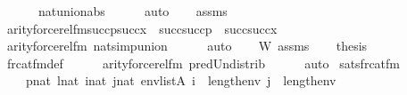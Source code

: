 \begin{isabellebody}
\ \ \ \ \ \ nat{\isacharunderscore}{\kern0pt}union{\isacharunderscore}{\kern0pt}abs{}\isanewline
\ \ \ \ \isamarkupfalse%
\ auto\isanewline
\ \ \isamarkupfalse%
\ assms\isanewline
\ \ \isamarkupfalse%
\ {\isachardoublequoteopen}arity{\isacharparenleft}{\kern0pt}forcerel{\isacharunderscore}{\kern0pt}fm{\isacharparenleft}{\kern0pt}succ{\isacharparenleft}{\kern0pt}p{\isacharparenright}{\kern0pt}{\isacharcomma}{\kern0pt}succ{\isacharparenleft}{\kern0pt}x{\isacharparenright}{\kern0pt}{\isacharcomma}{\kern0pt}{}{\isacharparenright}{\kern0pt}{\isacharparenright}{\kern0pt}\ {\isacharequal}{\kern0pt}\ succ{\isacharparenleft}{\kern0pt}succ{\isacharparenleft}{\kern0pt}p{\isacharparenright}{\kern0pt}{\isacharparenright}{\kern0pt}\ {\isasymunion}\ succ{\isacharparenleft}{\kern0pt}succ{\isacharparenleft}{\kern0pt}x{\isacharparenright}{\kern0pt}{\isacharparenright}{\kern0pt}{\isachardoublequoteclose}\isanewline
\ \ \ \ \isamarkupfalse%
\ arity{\isacharunderscore}{\kern0pt}forcerel{\isacharunderscore}{\kern0pt}fm\ nat{\isacharunderscore}{\kern0pt}simp{\isacharunderscore}{\kern0pt}union\isanewline
\ \ \ \ \isamarkupfalse%
\ auto\isanewline
\ \ \isamarkupfalse%
\ W\ assms\isanewline
\ \ \isamarkupfalse%
\ {\isacharquery}{\kern0pt}thesis\isanewline
\ \ \ \ \isamarkupfalse%
\ frc{\isacharunderscore}{\kern0pt}at{\isacharunderscore}{\kern0pt}fm{\isacharunderscore}{\kern0pt}def\isanewline
\ \ \ \ \isamarkupfalse%
\ arity{\isacharunderscore}{\kern0pt}forcerel{\isacharunderscore}{\kern0pt}fm\ pred{\isacharunderscore}{\kern0pt}Un{\isacharunderscore}{\kern0pt}distrib\isanewline
\ \ \ \ \isamarkupfalse%
\ auto\isanewline
{}\isamarkupfalse%
%
\endisatagproof
{\isafoldproof}%
%
\isadelimproof
\isanewline
%
\endisadelimproof
\isanewline
{}\isamarkupfalse%
\ sats{\isacharunderscore}{\kern0pt}frc{\isacharunderscore}{\kern0pt}at{\isacharunderscore}{\kern0pt}fm\ {\isacharcolon}{\kern0pt}\isanewline
\ \ \isanewline
\ \ \ \ {\isachardoublequoteopen}p{\isasymin}nat{\isachardoublequoteclose}\ {\isachardoublequoteopen}l{\isasymin}nat{\isachardoublequoteclose}\ {\isachardoublequoteopen}i{\isasymin}nat{\isachardoublequoteclose}\ {\isachardoublequoteopen}j{\isasymin}nat{\isachardoublequoteclose}\ {\isachardoublequoteopen}env{\isasymin}list{\isacharparenleft}{\kern0pt}A{\isacharparenright}{\kern0pt}{\isachardoublequoteclose}\ {\isachardoublequoteopen}i\ {\isacharless}{\kern0pt}\ length{\isacharparenleft}{\kern0pt}env{\isacharparenright}{\kern0pt}{\isachardoublequoteclose}\ {\isachardoublequoteopen}j\ {\isacharless}{\kern0pt}\ length{\isacharparenleft}{\kern0pt}env{\isacharparenright}{\kern0pt}{\isachardoublequoteclose}\isanewline

\end{isabellebody}
